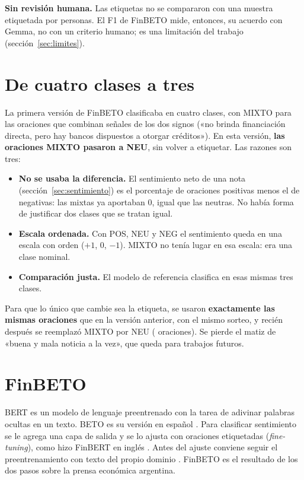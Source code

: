 \textbf{Sin revisión humana.} Las etiquetas no se compararon con una muestra etiquetada por
personas. El F1 de FinBETO mide, entonces, su acuerdo con Gemma, no con un criterio humano; es una
limitación del trabajo (sección~\ref{sec:limites}).

\section{De cuatro clases a tres}
\label{sec:tresclases}

La primera versión de FinBETO clasificaba en cuatro clases, con MIXTO para las oraciones que
combinan señales de los dos signos («no brinda financiación directa, pero hay bancos dispuestos a
otorgar créditos»). En esta versión, \textbf{las oraciones MIXTO pasaron a NEU}, sin volver a
etiquetar. Las razones son tres:

\begin{itemize}
  \item \textbf{No se usaba la diferencia.} El sentimiento neto de una nota
        (sección~\ref{sec:sentimiento}) es el porcentaje de oraciones positivas menos el de
        negativas: las mixtas ya aportaban 0, igual que las neutras. No había forma de justificar
        dos clases que se tratan igual.
  \item \textbf{Escala ordenada.} Con POS, NEU y NEG el sentimiento queda en una escala con orden
        ($+1$, $0$, $-1$). MIXTO no tenía lugar en esa escala: era una clase nominal.
  \item \textbf{Comparación justa.} El modelo de referencia clasifica en esas mismas tres clases.
\end{itemize}

Para que lo único que cambie sea la etiqueta, se usaron \textbf{exactamente las mismas oraciones}
que en la versión anterior, con el mismo sorteo, y recién después se reemplazó MIXTO por NEU
( oraciones). Se pierde el matiz de «buena y mala noticia a la
vez», que queda para trabajos futuros.

\section{FinBETO}
\label{sec:finbeto}

BERT \citep{devlin2019bert} es un modelo de lenguaje preentrenado con la tarea de adivinar palabras
ocultas en un texto. BETO es su versión en español \citep{canete2020beto}. Para clasificar
sentimiento se le agrega una capa de salida y se lo ajusta con oraciones etiquetadas
(\textit{fine-tuning}), como hizo FinBERT en inglés \citep{araci2019finbert}. Antes del ajuste
conviene seguir el preentrenamiento con texto del propio dominio \citep{gururangan2020dapt}.
FinBETO es el resultado de los dos pasos sobre la prensa económica argentina.

